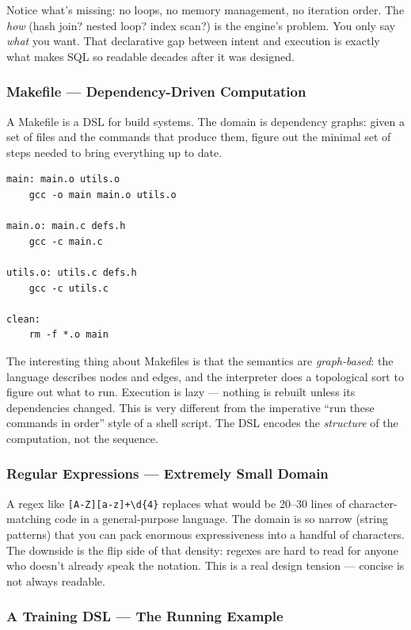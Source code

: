 Notice what's missing: no loops, no memory management, no iteration order. The \emph{how}
(hash join? nested loop? index scan?) is the engine's problem. You only say \emph{what}
you want. That declarative gap between intent and execution is exactly what makes SQL so
readable decades after it was designed.

\subsubsection{Makefile --- Dependency-Driven Computation}

A Makefile is a DSL for build systems. The domain is dependency graphs: given a set of
files and the commands that produce them, figure out the minimal set of steps needed to
bring everything up to date.

\begin{lstlisting}
main: main.o utils.o
	gcc -o main main.o utils.o

main.o: main.c defs.h
	gcc -c main.c

utils.o: utils.c defs.h
	gcc -c utils.c

clean:
	rm -f *.o main
\end{lstlisting}

The interesting thing about Makefiles is that the semantics are \emph{graph-based}: the
language describes nodes and edges, and the interpreter does a topological sort to figure
out what to run. Execution is lazy --- nothing is rebuilt unless its dependencies changed.
This is very different from the imperative ``run these commands in order'' style of a shell
script. The DSL encodes the \emph{structure} of the computation, not the sequence.

\subsubsection{Regular Expressions --- Extremely Small Domain}

A regex like \texttt{[A-Z][a-z]+\textbackslash{}d\{4\}} replaces what would be
20--30 lines of character-matching code in a general-purpose language. The domain is so
narrow (string patterns) that you can pack enormous expressiveness into a handful of
characters. The downside is the flip side of that density: regexes are hard to read for
anyone who doesn't already speak the notation. This is a real design tension --- concise
is not always readable.

\subsubsection{A Training DSL --- The Running Example}

